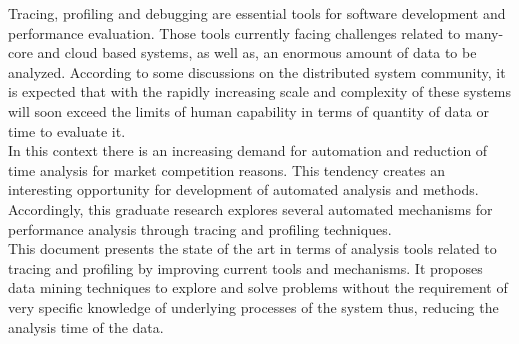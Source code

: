 \label{sec:Introduction}  %
Tracing, profiling and debugging are essential tools for software development and performance evaluation. Those tools currently facing challenges related to many-core and cloud based systems, as well as, an enormous amount of data to be analyzed. According to some discussions on the distributed system community,  it is expected that with the rapidly increasing scale and complexity of these systems will soon exceed the limits of human capability in terms of quantity of data or time to evaluate it.\\
In this context there is an increasing demand for automation and reduction of time analysis for market competition reasons. This tendency creates an interesting opportunity for development of automated analysis and methods. Accordingly, this graduate research explores several automated mechanisms for performance analysis through tracing and profiling techniques. \\
This document presents the state of the art in terms of analysis tools related to tracing and profiling by improving current tools and mechanisms. It proposes data mining techniques to explore and solve problems without the requirement of very specific knowledge of underlying processes of the system thus, reducing the analysis time of the data.

